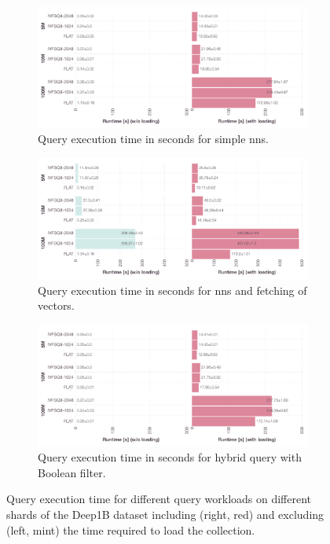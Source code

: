 \begin{figure}[p]
    \centering
    \begin{subfigure}[b]{\textwidth}
        \centering
        \includegraphics[width=\textwidth]{figures/milvus/biganns-milvus-NNS.pdf}
        \caption{Query execution time in seconds for simple \acrshort{nns}.}
        \label{figure:milvus_nns}
    \end{subfigure}
    \hfill
    \centering
    \begin{subfigure}[b]{\textwidth}
        \centering
        \includegraphics[width=\textwidth]{figures/milvus/biganns-milvus-NNS + Fetch}
        \caption{Query execution time in seconds for \acrshort{nns} and fetching of vectors.}
        \label{figure:milvus_nns_fetch}
    \end{subfigure}
    \hfill
    \centering
    \begin{subfigure}[b]{\textwidth}
        \centering
        \includegraphics[width=\textwidth]{figures/milvus/biganns-milvus-Hybrid}
        \caption{Query execution time in seconds for hybrid query with Boolean filter.}
        \label{figure:milvus_hybrid}
    \end{subfigure}
    \caption{Query execution time for different query workloads on different shards of the Deep1B dataset including (right, red) and excluding (left, mint) the time required to load the collection.}
    \label{figure:milvus_runtime}
\end{figure}

